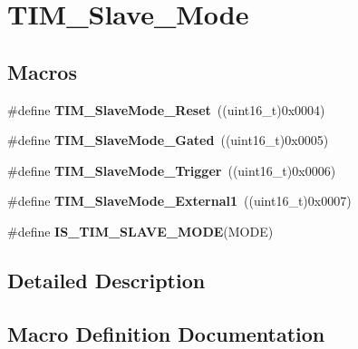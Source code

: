 \hypertarget{group___t_i_m___slave___mode}{}\section{T\+I\+M\+\_\+\+Slave\+\_\+\+Mode}
\label{group___t_i_m___slave___mode}
\subsection*{Macros}
\begin{DoxyCompactItemize}
\item 
\#define {\bfseries T\+I\+M\+\_\+\+Slave\+Mode\+\_\+\+Reset}~((uint16\+\_\+t)0x0004)\hypertarget{group___t_i_m___slave___mode_gaac1cec731f1a5e680a038c4f472f74af}{}\label{group___t_i_m___slave___mode_gaac1cec731f1a5e680a038c4f472f74af}

\item 
\#define {\bfseries T\+I\+M\+\_\+\+Slave\+Mode\+\_\+\+Gated}~((uint16\+\_\+t)0x0005)\hypertarget{group___t_i_m___slave___mode_ga1f36c870b926f70b32f274bbc0bc39a5}{}\label{group___t_i_m___slave___mode_ga1f36c870b926f70b32f274bbc0bc39a5}

\item 
\#define {\bfseries T\+I\+M\+\_\+\+Slave\+Mode\+\_\+\+Trigger}~((uint16\+\_\+t)0x0006)\hypertarget{group___t_i_m___slave___mode_ga9e7726c04ee1bafec97226f08adf5677}{}\label{group___t_i_m___slave___mode_ga9e7726c04ee1bafec97226f08adf5677}

\item 
\#define {\bfseries T\+I\+M\+\_\+\+Slave\+Mode\+\_\+\+External1}~((uint16\+\_\+t)0x0007)\hypertarget{group___t_i_m___slave___mode_ga34427a693157ab177fead9871185bd35}{}\label{group___t_i_m___slave___mode_ga34427a693157ab177fead9871185bd35}

\item 
\#define {\bfseries I\+S\+\_\+\+T\+I\+M\+\_\+\+S\+L\+A\+V\+E\+\_\+\+M\+O\+DE}(M\+O\+DE)
\end{DoxyCompactItemize}


\subsection{Detailed Description}


\subsection{Macro Definition Documentation}
